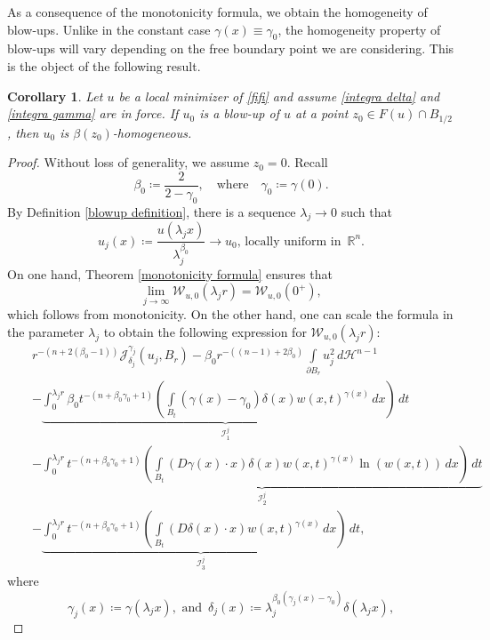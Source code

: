 \documentclass[reqno,11pt]{amsart}
\newtheorem{corollary}{Corollary}[section]
\newcommand{\1}{\mathds{1}}
\numberwithin{equation}{section}
\begin{document}
As a consequence of the monotonicity formula, we obtain the homogeneity of blow-ups. Unlike in the constant case $\gamma(x) \equiv \gamma_0$, the homogeneity property of blow-ups will vary depending on the free boundary point we are considering. This is the object of the following result.

\begin{corollary}\label{classification of blow ups}
Let $u$ be a local minimizer of \eqref{fifi} and assume \eqref{integra delta} and \eqref{integra gamma} are in force. If $u_0$ is a blow-up of $u$ at a point $z_0 \in F(u) \cap B_{1/2}$, then $u_0$ is $\beta(z_0)$-homogeneous.
\end{corollary}
\begin{proof}
Without loss of generality, we assume $z_0 = 0$. Recall
$$
    \beta_0 \coloneqq  \frac{2}{2-\gamma_0}, \quad \text{where} \quad \gamma_0 \coloneqq \gamma(0).
$$
By Definition \ref{blowup definition}, there is a sequence $\lambda_j \to 0$ such that
$$
	u_j(x) \coloneqq \frac{u(\lambda_j x)}{\lambda_j^{\beta_0}} \to u_0,\, \text{locally uniform in }\, \mathbb{R}^n.
$$
On one hand, Theorem \ref{monotonicity formula} ensures that
\begin{equation}\label{formula is monotone}
	\lim_{j \to \infty} \mathcal{W}_{u,0}(\lambda_j r) = \mathcal{W}_{u,0}(0^+),
\end{equation}
which follows from monotonicity. On the other hand, one can scale the formula in the parameter $\lambda_j$ to obtain the following expression for $\mathcal{W}_{u,0}(\lambda_j r)$:
\begin{eqnarray*}
	 &  & r^{-(n+2(\beta_0-1))}\mathcal{J}_{\delta_j}^{\gamma_j}(u_j,B_r)-\beta_0 r^{-((n-1) + 2\beta_0)}\int\limits_{\partial B_r}u_j^2\, d\mathcal{H}^{n-1}\\
	&  & - \underbrace{\int_{0}^{\lambda_j r} \beta_0 t^{-(n+\beta_0 \gamma_0 +1)}\left(\int\limits_{B_t}(\gamma(x)-\gamma_0)\delta(x)w(x,t)^{\gamma(x)} \, dx\right)\, dt}_{\mathcal{I}^j_1} \\
    &  & - \underbrace{\int_{0}^{\lambda_j r} t^{-(n+\beta_0 \gamma_0 + 1)}\left(\int\limits_{B_t}\left(D\gamma(x)\cdot x\right) \delta(x) w(x,t)^{\gamma(x)}  \ln(w(x,t)) \, dx\right)\, dt}_{\mathcal{I}^j_2}\\
    &  & -  \underbrace{\int_{0}^{\lambda_j r} t^{-(n+\beta_0 \gamma_0 + 1)} \left(\int\limits_{B_t} (D\delta(x) \cdot x)w(x,t)^{\gamma(x)} \, dx\right)\,dt}_{\mathcal{I}^j_3},
\end{eqnarray*}
where
$$
	\gamma_j(x) \coloneqq \gamma(\lambda_j x), \text{ and }\, \delta_j(x) \coloneqq \lambda_j^{\beta_0(\gamma_j(x)-\gamma_0)}\delta(\lambda_j x), 
$$
\end{proof}
\end{document}
